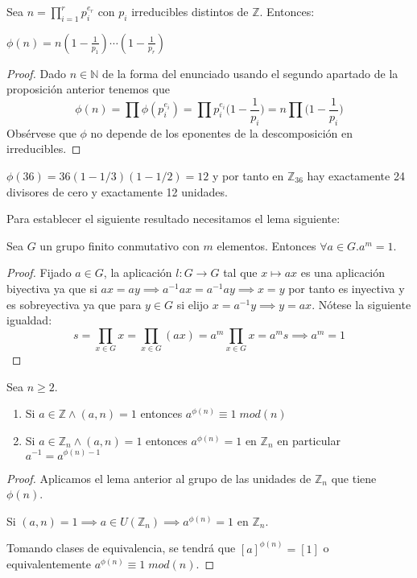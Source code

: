 \begin{theorem}
Sea $n = \prod_{i = 1}^r p_i^{e_r}$ con $p_i$ irreducibles distintos de $\mathbb{Z}$. Entonces:

$\phi(n) = n(1 - \frac{1}{p_1}) \cdots (1-\frac{1}{p_r})$
\end{theorem}
\begin{proof}
Dado $n \in \mathbb{N}$ de la forma del enunciado usando el segundo apartado de la proposición anterior tenemos que $$\phi(n) = \prod \phi(p_i^{e_i}) = \prod p_i^{e_i}\Big(1- \frac{1}{p_i}\Big) = n \prod \Big(1- \frac{1}{p_i}\Big)$$ Obsérvese que $\phi$ no depende de los eponentes de la descomposición en irreducibles. 	
\end{proof}

\begin{example}
	$\phi(36) = 36(1-1/3)(1-1/2) = 12$ y por tanto en $\mathbb{Z}_{36}$ hay exactamente 24 divisores de cero y exactamente 12 unidades. 
\end{example}

Para establecer el siguiente resultado necesitamos el lema siguiente:

\begin{lemma}
Sea $G$ un grupo finito conmutativo con $m$ elementos. Entonces $\forall a \in G. a^m = 1$. 
\end{lemma}
\begin{proof}
Fijado $a \in G$, la aplicación $l:G \to G$ tal que $x \mapsto ax$ es una aplicación biyectiva ya que si $ax = ay \implies a^{-1}ax = a^{-1}ay \implies x = y$ por tanto es inyectiva y es sobreyectiva ya que para $y \in G$ si elijo $x = a^{-1}y \implies y = ax$. Nótese la siguiente igualdad: $$s = \prod_{x \in G} x = \prod_{x \in G} (ax) = a^m \prod_{x \in G} x = a^ms \implies a^m = 1$$
\end{proof}

\begin{theorem}
	Sea $n \ge 2$. 
	
	\begin{enumerate}
		\item Si $a \in \mathbb{Z} \land (a,n) = 1$ entonces $a^{\phi(n)} \equiv 1 \; mod(n)$ 
		\item Si $a \in \mathbb{Z}_n \land (a,n) = 1$ entonces $a^{\phi(n)} = 1$ en $\mathbb{Z}_n$ en particular $a^{-1} = a^{\phi(n) - 1}$
	\end{enumerate}
\end{theorem}
\begin{proof}
Aplicamos el lema anterior al grupo de las unidades de $\mathbb{Z}_n$ que tiene $\phi(n)$. 

Si $(a,n) = 1 \implies a \in U(\mathbb{Z}_n) \implies a^{\phi(n)} = 1$ en $\mathbb{Z}_n$. 

Tomando clases de equivalencia, se tendrá que $[a]^{\phi(n)} = [1]$ o equivalentemente $a^{\phi(n)} \equiv 1 \; mod(n)$. 
\end{proof}


